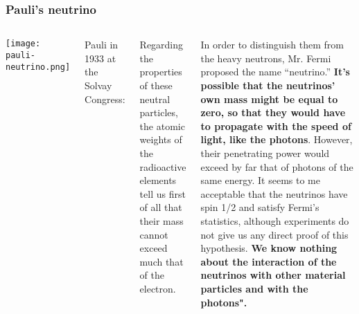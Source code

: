 \begin{frame}
\frametitle{Pauli's neutrino}
\begin{columns}
\texttt{[image: pauli-neutrino.png]}

\noindent Pauli in  1933 at the Solvay Congress: 

Regarding the properties of these neutral particles, the atomic weights
of the radioactive elements tell us first of all that their mass cannot exceed
much that of the electron.

 In order to distinguish them from the heavy
neutrons, Mr. Fermi proposed the name ``neutrino.'' {\bf It's possible that the
neutrinos' own mass might be equal to zero, so that they would have to
propagate with the speed of light, like the photons}. However, their penetrating power would exceed by far that of photons of the same energy. It
seems to me acceptable that the neutrinos have spin 1/2 and satisfy Fermi's 
statistics, although experiments do not give us any direct proof of this hypothesis. 
{\bf We know nothing about the interaction of the neutrinos with other material particles and with the photons".}
\end{columns}
\end{frame}

% 

%
% 
%
%
%

